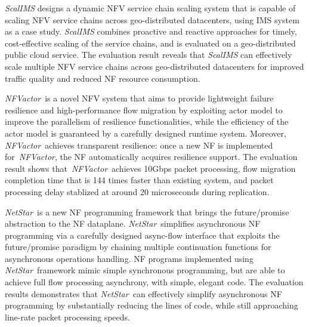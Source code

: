 \documentclass[a4paper, 11pt, oneside]{Thesis}  %
\def\netstar{\textit{NetStar}}
\def\nfactor{\textit{NFVactor}}
\begin{document}
{\textit{ScalIMS} designs a dynamic NFV service chain scaling system that is capable of scaling NFV service chains across geo-distributed datacenters, using IMS system as a case study. \textit{ScalIMS} combines proactive and reactive approaches for timely, cost-effective scaling of the service chains, and is evaluated on a geo-distributed public cloud service. The evaluation result reveals that \textit{ScalIMS} can effectively scale multiple NFV service chains across geo-distributed datacenters for improved traffic quality and reduced NF resource consumption.

\nfactor~is a novel NFV system that aims to provide lightweight failure resilience and high-performance flow migration by exploiting actor model to improve the parallelism of resilience functionalities, while the efficiency of the actor model is guaranteed by a carefully designed runtime system. Moreover, \nfactor~achieves transparent resilience: once a new NF is implemented for~\nfactor, the NF automatically acquires resilience support. The evaluation result shows that~\nfactor~achieves 10Gbps packet processing, flow migration completion time that is 144 times faster than existing system, and packet processing delay stablized at around 20 microseconds during replication.

\netstar~is a new NF programming framework that brings the future/promise abstraction to the NF dataplane. \netstar~simplifies asynchronous NF programming via a carefully designed async-flow interface that exploits the future/promise paradigm by chaining multiple continuation functions for asynchronous operations handling. NF programs implemented using \netstar~framework mimic simple synchronous programming, but are able to achieve full flow processing asynchrony, with simple, elegant code. The evaluation results demonstrates that \netstar~can effectively simplify asynchronous NF programming by substantially reducing the lines of code, while still approaching line-rate packet processing speeds.

\vspace{1em}
\noindent [{\bf 479 Words}]
}

\clearpage  %

\end{document}
